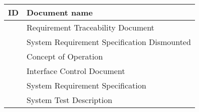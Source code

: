 \begin{tabular}{b{6.5cm} b{7cm}}
	\textbf{ID} & \textbf{Document name} \\
	\hline
	\rtm & Requirement Traceability Document \\
	\srsdis & System Requirement Specification Dismounted \\
	\conops & Concept of Operation\\
	\picd & Interface Control Document\\
	\srshq & System Requirement Specification\\
	\std & System Test Description\\
\end{tabular}


